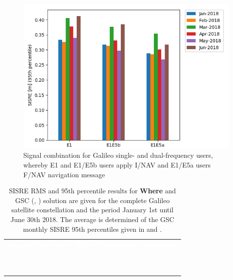 \documentclass{beamer}
\begin{document}
\begin{frame}[t]
\begin{columns}
\begin{column}[t]{.28\textwidth}
     \vspace*{1.5cm}

     \begin{figure}
       \includegraphics[width=\linewidth]{figure/plot_bar_sisre_signal_combination_percentile}
       \caption{Signal combination for Galileo single- and dual-frequency users, whereby E1 and E1/E5b users apply I/NAV and E1/E5a users F/NAV navigation message}
       \label{fig:sisre_signal_comb}
     \end{figure}

     \vspace*{1.5cm}

     \begin{table}
        \color{black}
        \caption{SISRE RMS and 95th percentile results for \textbf{Where} and GSC (\cite{galileo-is-os-2018-jan}, \cite{galileo-is-os-2018-apr}) solution are given for the complete Galileo satellite constellation and the period January 1st until June 30th 2018. The average is determined of the GSC monthly SISRE 95th percentiles given in \cite{galileo-is-os-2018-jan} and \cite{galileo-is-os-2018-apr}.}
        \label{tab:sisre_results}
        \begin{tabular}{lcccc}
        \hline
        \rowcolor{kvgreen}\textcolor{white}{\textbf{Signal}} & \textcolor{white}{\textbf{Nav. type}} & \textcolor{white}{\textbf{RMS}} & \textcolor{white}{\textbf{95th perc.}} & \textcolor{white}{\textbf{95th perc.}}\\
        \rowcolor{kvgreen}\textcolor{white}{} &  & \textcolor{white}{\textit{Where}} & \textcolor{white}{\textit{Where}} & \textcolor{white}{\textit{GSC}}\\
        \rowcolor{kvgreen}\textcolor{white}{} &  & \textcolor{white}{[cm]} & \textcolor{white}{[cm]} & \textcolor{white}{[cm]}\\


\end{tabular}
\end{table}
\end{column}
\end{columns}
\end{frame}
\end{document}
